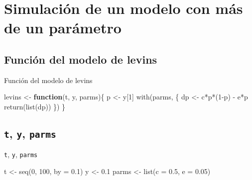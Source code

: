 \documentclass[
  11pt,
  ignorenonframetext,
]{beamer}
\newenvironment{Shaded}{}{}
\newcommand{\AttributeTok}[1]{\textcolor[rgb]{0.49,0.56,0.16}{#1}}
\newcommand{\ControlFlowTok}[1]{\textcolor[rgb]{0.00,0.44,0.13}{\textbf{#1}}}
\newcommand{\DecValTok}[1]{\textcolor[rgb]{0.25,0.63,0.44}{#1}}
\newcommand{\FloatTok}[1]{\textcolor[rgb]{0.25,0.63,0.44}{#1}}
\newcommand{\FunctionTok}[1]{\textcolor[rgb]{0.02,0.16,0.49}{#1}}
\newcommand{\NormalTok}[1]{#1}
\newcommand{\OtherTok}[1]{\textcolor[rgb]{0.00,0.44,0.13}{#1}}
\newcommand{\SpecialCharTok}[1]{\textcolor[rgb]{0.25,0.44,0.63}{#1}}
\begin{document}
\hypertarget{simulaciuxf3n-de-un-modelo-con-muxe1s-de-un-paruxe1metro}{%
\section{Simulación de un modelo con más de un
parámetro}\label{simulaciuxf3n-de-un-modelo-con-muxe1s-de-un-paruxe1metro}}

\hypertarget{funciuxf3n-del-modelo-de-levins}{%
\subsection{Función del modelo de
levins}\label{funciuxf3n-del-modelo-de-levins}}

\begin{frame}[fragile]{Función del modelo de levins}
\begin{Shaded}
\begin{Highlighting}[]
\NormalTok{levins }\OtherTok{\textless{}{-}} \ControlFlowTok{function}\NormalTok{(t, y, parms)\{}
\NormalTok{  p }\OtherTok{\textless{}{-}}\NormalTok{ y[}\DecValTok{1}\NormalTok{]}
  \FunctionTok{with}\NormalTok{(parms, \{}
\NormalTok{    dp }\OtherTok{\textless{}{-}}\NormalTok{ c}\SpecialCharTok{*}\NormalTok{p}\SpecialCharTok{*}\NormalTok{(}\DecValTok{1}\SpecialCharTok{{-}}\NormalTok{p) }\SpecialCharTok{{-}}\NormalTok{ e}\SpecialCharTok{*}\NormalTok{p}
    \FunctionTok{return}\NormalTok{(}\FunctionTok{list}\NormalTok{(dp))}
\NormalTok{  \})}
\NormalTok{\}}
\end{Highlighting}
\end{Shaded}
\end{frame}

\hypertarget{t-y-parms}{%
\subsection{\texorpdfstring{\texttt{t}, \texttt{y},
\texttt{parms}}{t, y, parms}}\label{t-y-parms}}

\begin{frame}[fragile]{\texttt{t}, \texttt{y}, \texttt{parms}}
\begin{Shaded}
\begin{Highlighting}[]
\NormalTok{t }\OtherTok{\textless{}{-}} \FunctionTok{seq}\NormalTok{(}\DecValTok{0}\NormalTok{, }\DecValTok{100}\NormalTok{, }\AttributeTok{by =} \FloatTok{0.1}\NormalTok{)}
\NormalTok{y }\OtherTok{\textless{}{-}} \FloatTok{0.1}
\NormalTok{parms }\OtherTok{\textless{}{-}} \FunctionTok{list}\NormalTok{(}\AttributeTok{c =} \FloatTok{0.5}\NormalTok{, }\AttributeTok{e =} \FloatTok{0.05}\NormalTok{)}
\end{Highlighting}
\end{Shaded}
\end{frame}
\end{document}
